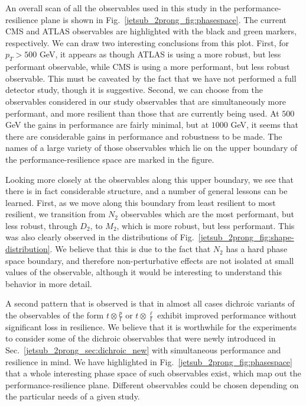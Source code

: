 \documentclass[11pt]{cernrep}
\begin{document}
An overall scan of all the observables used in this study in the performance-resilience plane is shown in Fig.~\ref{jetsub_2prong_fig:phasespace}.
%
The current CMS and ATLAS observables are highlighted with the black and green markers, respectively. We can draw two interesting conclusions from this plot.
%
First, for $p_T> 500$ GeV, it appears as though ATLAS is using a more robust, but less performant observable, while CMS is using a more performant, but less robust observable.
%
This must be caveated by the fact that we have not performed a full detector study, though it is suggestive.
%
Second, we can choose from the observables considered in our study observables that are simultaneously more performant, and more resilient than those that are currently being used.
%
At $500$ GeV the gains in performance are fairly minimal, but at $1000$ GeV, it seems that there are considerable gains in performance and robustness to be made.
%
The names of a large variety of those observables which lie on the upper boundary of the performance-resilience space are marked in the figure. 


Looking more closely at the observables along this upper boundary, we see that there is in fact considerable structure, and a number of general lessons can be learned.
%
First, as we move along this boundary from least resilient to most resilient, we transition from $N_2$ observables which are the most performant, but less robust, through $D_2$, to $M_2$, which is more robust, but less performant.
%
This was also clearly observed in the distributions of Fig.~\ref{jetsub_2prong_fig:shape-distribution}.
%
We believe that this is due to the fact that $N_2$ has a hard phase space boundary, and therefore non-perturbative effects are not isolated at small values of the observable, although it would be interesting to understand this behavior in more detail. 

A second pattern that is observed is that in almost all cases dichroic variants of the observables of the form $t\otimes \frac{p}{t}$ or $t\otimes\frac{\ell}{t}$ exhibit improved performance without significant loss in resilience.
%
We believe that it is worthwhile for the experiments to consider some of the dichroic observables that were newly introduced in Sec.~\ref{jetsub_2prong_sec:dichroic_new} with simultaneous performance and resilience in mind.
%
We have highlighted in Fig.~\ref{jetsub_2prong_fig:phasespace} that a whole interesting phase space of such observables exist, which map out the performance-resilience plane.
%
Different observables could be chosen depending on the particular needs of a given study.
\end{document}

